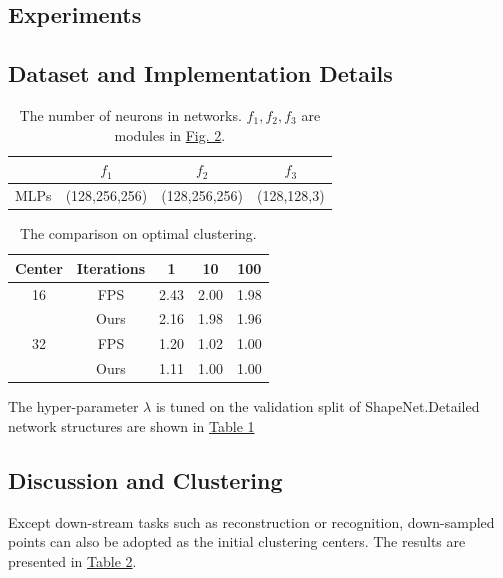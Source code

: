 \documentclass[14pt]{article}
\begin{document}
\begin{multicols}{2}
\section{Experiments}
\subsection{Dataset and Implementation Details}
\label{subsec:4.1}
\begin{table}[H]
    \caption{The number of neurons in networks. $f_1 , f_2 , f_3$ are modules in \href{fig:fig2}{Fig. 2}.}
    \begin{tabular}{cccc}
		\hline
    	&$f_1$&$f_2$&$f_3$\\
		\hline
		MLPs&(128,256,256)&(128,256,256)&(128,128,3)\\
		\hline
    \end{tabular}
	\label{table:1}
\end{table}

\begin{table}[H]
    \caption{The comparison on optimal clustering.}
    \begin{tabular}{ccccc}
		\hline
    	Center&Iterations&1&10&100\\
		\hline
		16&FPS&2.43&2.00&1.98\\
		&Ours&2.16&1.98&1.96\\
		32&FPS&1.20&1.02&1.00\\
		&Ours&1.11&1.00&1.00\\
		\hline
    \end{tabular}
	\label{table:2}
\end{table}
The hyper-parameter $\lambda$ is tuned on the validation split of ShapeNet.Detailed network structures are shown in \href{table:1}{Table 1}

\subsection{Discussion and Clustering}
Except down-stream tasks such as reconstruction or recognition, down-sampled points can also be adopted as the initial clustering centers.  The results are presented in \href{table:2}{Table 2}.


\end{multicols}
\end{document}
